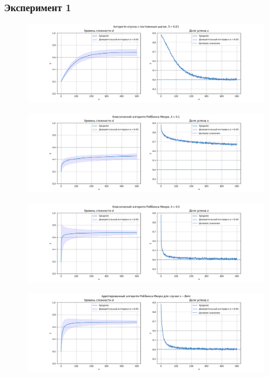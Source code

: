 \subsubsection{Эксперимент 1}
\begin{figure}[h!]
    \centering
    \includegraphics[width=0.95\textwidth]{assets/work/rating/1/fixed.png}
    \label{exp1:fixed}
\end{figure}
\begin{figure}[h!]
    \centering
    \includegraphics[width=0.95\textwidth]{assets/work/rating/1/lambda_0.1.png}
    \label{exp1:lambda_0.1}
\end{figure}
\begin{figure}[h!]
    \centering
    \includegraphics[width=0.95\textwidth]{assets/work/rating/1/lambda_0.5.png}
    \label{exp1:lambda_0.5}
\end{figure}
\begin{figure}[h!]
    \centering
    \includegraphics[width=0.95\textwidth]{assets/work/rating/1/adaptive.png}
    \label{exp1:adaptive}
\end{figure}
\pagebreak
